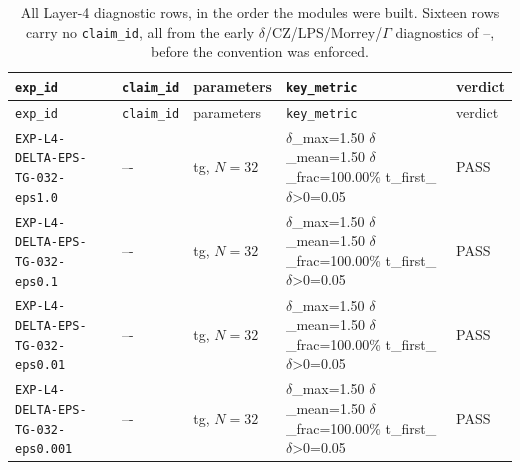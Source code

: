 {\scriptsize
\begin{longtable}{@{}>{\raggedright\arraybackslash}p{} >{\raggedright\arraybackslash}p{} >{\raggedright\arraybackslash}p{} >{\raggedright\arraybackslash}p{} l@{}}
\caption[Layer 4 experiments]{All Layer-4 diagnostic rows, in the order the modules were built. Sixteen rows carry no \texttt{claim\_id}, all from the early $\delta$/CZ/LPS/Morrey/$\Gamma$ diagnostics of --, before the convention was enforced.}
\label{tab:a1-layer4}\\
\toprule
\texttt{exp\_id} & \texttt{claim\_id} & parameters & \texttt{key\_metric} & verdict\\
\midrule
\endfirsthead
\toprule
\texttt{exp\_id} & \texttt{claim\_id} & parameters & \texttt{key\_metric} & verdict\\
\midrule
\endhead
\bottomrule
\endfoot
\texttt{EXP-\allowbreak{}L4-\allowbreak{}DELTA-\allowbreak{}EPS-\allowbreak{}TG-\allowbreak{}032-\allowbreak{}eps1.0} & --\allowbreak{}-\allowbreak{} & tg, $N=\allowbreak{}32$ & $\delta$\_\allowbreak{}max=\allowbreak{}1.50  $\delta$\_\allowbreak{}mean=\allowbreak{}1.50  $\delta$\_\allowbreak{}frac=\allowbreak{}100.00\%  t\_\allowbreak{}first\_\allowbreak{}$\delta$>0=\allowbreak{}0.05 & \textsf{PASS}\\
\texttt{EXP-\allowbreak{}L4-\allowbreak{}DELTA-\allowbreak{}EPS-\allowbreak{}TG-\allowbreak{}032-\allowbreak{}eps0.1} & --\allowbreak{}-\allowbreak{} & tg, $N=\allowbreak{}32$ & $\delta$\_\allowbreak{}max=\allowbreak{}1.50  $\delta$\_\allowbreak{}mean=\allowbreak{}1.50  $\delta$\_\allowbreak{}frac=\allowbreak{}100.00\%  t\_\allowbreak{}first\_\allowbreak{}$\delta$>0=\allowbreak{}0.05 & \textsf{PASS}\\
\texttt{EXP-\allowbreak{}L4-\allowbreak{}DELTA-\allowbreak{}EPS-\allowbreak{}TG-\allowbreak{}032-\allowbreak{}eps0.01} & --\allowbreak{}-\allowbreak{} & tg, $N=\allowbreak{}32$ & $\delta$\_\allowbreak{}max=\allowbreak{}1.50  $\delta$\_\allowbreak{}mean=\allowbreak{}1.50  $\delta$\_\allowbreak{}frac=\allowbreak{}100.00\%  t\_\allowbreak{}first\_\allowbreak{}$\delta$>0=\allowbreak{}0.05 & \textsf{PASS}\\
\texttt{EXP-\allowbreak{}L4-\allowbreak{}DELTA-\allowbreak{}EPS-\allowbreak{}TG-\allowbreak{}032-\allowbreak{}eps0.001} & --\allowbreak{}-\allowbreak{} & tg, $N=\allowbreak{}32$ & $\delta$\_\allowbreak{}max=\allowbreak{}1.50  $\delta$\_\allowbreak{}mean=\allowbreak{}1.50  $\delta$\_\allowbreak{}frac=\allowbreak{}100.00\%  t\_\allowbreak{}first\_\allowbreak{}$\delta$>0=\allowbreak{}0.05 & \textsf{PASS}\\

\end{longtable}}
